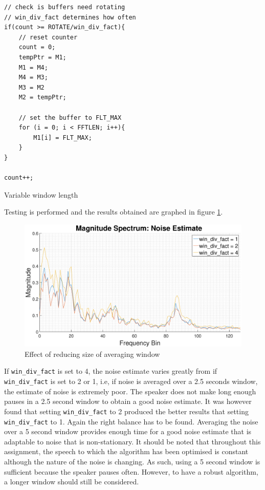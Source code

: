 \documentclass[a4paper,pra,twocolumn,10pt,aps,longbibliography,nobalancelastpage]{revtex4-1}
\begin{document}
\begin{listing}[H]
\begin{verbatim}
// check is buffers need rotating
// win_div_fact determines how often 
if(count >= ROTATE/win_div_fact){
    // reset counter
    count = 0;
    tempPtr = M1;
    M1 = M4;
    M4 = M3;
    M3 = M2
    M2 = tempPtr;
    
    // set the buffer to FLT_MAX
    for (i = 0; i < FFTLEN; i++){
        M1[i] = FLT_MAX;
    }
}	

count++;
\end{verbatim}
\caption{Variable window length} 
\label{lst:short_win}
\end{listing}

Testing is performed and the results obtained are graphed in figure \ref{fig:enhance_9}.

\begin{figure}[H]
    \centering
    \includegraphics[width = \columnwidth]{win_div_fact}
    \caption{Effect of reducing size of averaging window}
    \label{fig:enhance_9}
\end{figure}

If {\tt win\_div\_fact} is set to 4, the noise estimate varies greatly from if {\tt win\_div\_fact} is set to 2 or 1, i.e, if noise is averaged over a 2.5 seconds window, the estimate of noise is extremely poor. The speaker does not make long enough pauses in a 2.5 second window to obtain a good noise estimate. It was however found that setting {\tt win\_div\_fact} to 2 produced the better results that setting {\tt win\_div\_fact} to 1. Again the right balance has to be found. Averaging the noise over a 5 second window provides enough time for a good noise estimate that is adaptable to noise that is non-stationary. It should be noted that throughout this assignment, the speech to which the algorithm has been optimised is constant although the nature of the noise is changing. As such, using a 5 second window is sufficient because the speaker pauses often. However, to have a robust algorithm, a longer window should still be considered. 
\end{document}
